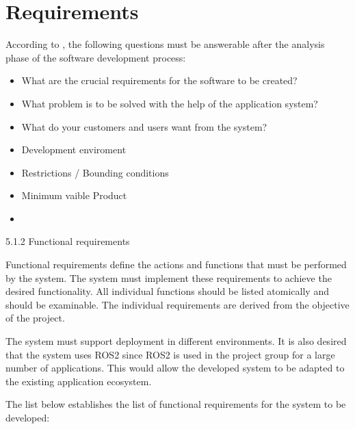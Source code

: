 	\section{Requirements}
	According to \cite{Koubaa2021}, the following questions must be answerable after the analysis phase of the software development process:
	\begin{itemize}
		\item What are the crucial requirements for the software to be created?
		\item What problem is to be solved with the help of the application system?
		\item What do your customers and users want from the system?
		\item Development enviroment
		\item Restrictions / Bounding conditions
		\item Minimum vaible Product
		\item 
	\end{itemize}

	5.1.2 Functional requirements

Functional requirements define the actions and functions that must be performed by the system. The system must implement these requirements to achieve the desired functionality. All individual functions should be listed atomically and should be examinable. The individual requirements are derived from the objective of the project. 

The system must support deployment in different environments. It is also desired that the system uses ROS2 since ROS2 is used in the project group for a large number of applications. This would allow the developed system to be adapted to the existing application ecosystem.

The list below establishes the list of functional requirements for the system to be developed:

